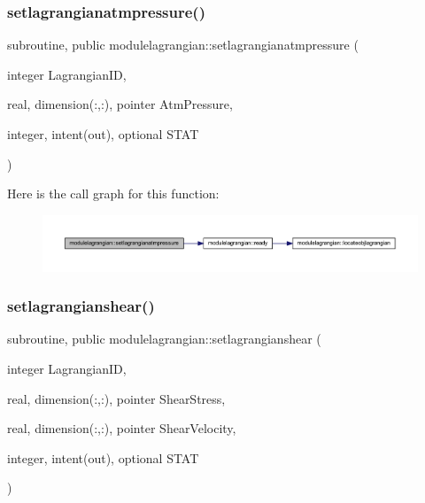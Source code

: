 \subsubsection{\texorpdfstring{setlagrangianatmpressure()}{setlagrangianatmpressure()}}
{\footnotesize\ttfamily subroutine, public modulelagrangian\+::setlagrangianatmpressure (\begin{DoxyParamCaption}\item[{integer}]{Lagrangian\+ID,  }\item[{real, dimension(\+:,\+:), pointer}]{Atm\+Pressure,  }\item[{integer, intent(out), optional}]{S\+T\+AT }\end{DoxyParamCaption})}

Here is the call graph for this function\+:\nopagebreak
\begin{figure}[H]
\begin{center}
\leavevmode
\includegraphics[width=350pt]{namespacemodulelagrangian_a219357c04fe0cbde7c3506f0fdb4ec61_cgraph}
\end{center}
\end{figure}
\mbox{\label{namespacemodulelagrangian_ab0d8db7a7c4e175fc509a8c3e6e6efab}} 
\subsubsection{\texorpdfstring{setlagrangianshear()}{setlagrangianshear()}}
{\footnotesize\ttfamily subroutine, public modulelagrangian\+::setlagrangianshear (\begin{DoxyParamCaption}\item[{integer}]{Lagrangian\+ID,  }\item[{real, dimension(\+:,\+:), pointer}]{Shear\+Stress,  }\item[{real, dimension(\+:,\+:), pointer}]{Shear\+Velocity,  }\item[{integer, intent(out), optional}]{S\+T\+AT }\end{DoxyParamCaption})}

